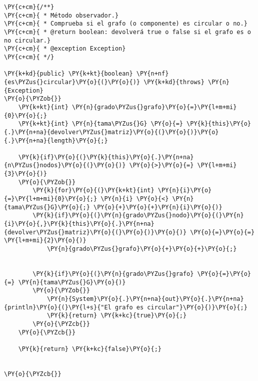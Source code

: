 \begin{Verbatim}[commandchars=\\\{\}]
\PY{c+cm}{/**}
\PY{c+cm}{ * Método observador.}
\PY{c+cm}{ * Comprueba si el grafo (o componente) es circular o no.}
\PY{c+cm}{ * @return boolean: devolverá true o false si el grafo es o no circular.}
\PY{c+cm}{ * @exception Exception}
\PY{c+cm}{ */}

\PY{k+kd}{public} \PY{k+kt}{boolean} \PY{n+nf}{es\PYZus{}circular}\PY{o}{(}\PY{o}{)} \PY{k+kd}{throws} \PY{n}{Exception}
\PY{o}{\PYZob{}}
    \PY{k+kt}{int} \PY{n}{grado\PYZus{}grafo}\PY{o}{=}\PY{l+m+mi}{0}\PY{o}{;}
    \PY{k+kt}{int} \PY{n}{tama\PYZus{}G} \PY{o}{=} \PY{k}{this}\PY{o}{.}\PY{n+na}{devolver\PYZus{}matriz}\PY{o}{(}\PY{o}{)}\PY{o}{.}\PY{n+na}{length}\PY{o}{;}

    \PY{k}{if}\PY{o}{(}\PY{k}{this}\PY{o}{.}\PY{n+na}{n\PYZus{}nodos}\PY{o}{(}\PY{o}{)} \PY{o}{>}\PY{o}{=} \PY{l+m+mi}{3}\PY{o}{)}
	\PY{o}{\PYZob{}}
	    \PY{k}{for}\PY{o}{(}\PY{k+kt}{int} \PY{n}{i}\PY{o}{=}\PY{l+m+mi}{0}\PY{o}{;} \PY{n}{i} \PY{o}{<} \PY{n}{tama\PYZus{}G}\PY{o}{;} \PY{o}{+}\PY{o}{+}\PY{n}{i}\PY{o}{)}
		\PY{k}{if}\PY{o}{(}\PY{n}{grado\PYZus{}nodo}\PY{o}{(}\PY{n}{i}\PY{o}{,}\PY{k}{this}\PY{o}{.}\PY{n+na}{devolver\PYZus{}matriz}\PY{o}{(}\PY{o}{)}\PY{o}{)} \PY{o}{=}\PY{o}{=} \PY{l+m+mi}{2}\PY{o}{)}
		    \PY{n}{grado\PYZus{}grafo}\PY{o}{+}\PY{o}{+}\PY{o}{;}
		

	    \PY{k}{if}\PY{o}{(}\PY{n}{grado\PYZus{}grafo} \PY{o}{=}\PY{o}{=} \PY{n}{tama\PYZus{}G}\PY{o}{)}
		\PY{o}{\PYZob{}}
		    \PY{n}{System}\PY{o}{.}\PY{n+na}{out}\PY{o}{.}\PY{n+na}{println}\PY{o}{(}\PY{l+s}{"El grafo es circular"}\PY{o}{)}\PY{o}{;}
		    \PY{k}{return} \PY{k+kc}{true}\PY{o}{;}
		\PY{o}{\PYZcb{}}
	\PY{o}{\PYZcb{}}
	
    \PY{k}{return} \PY{k+kc}{false}\PY{o}{;}

    
\PY{o}{\PYZcb{}}
\end{Verbatim}
